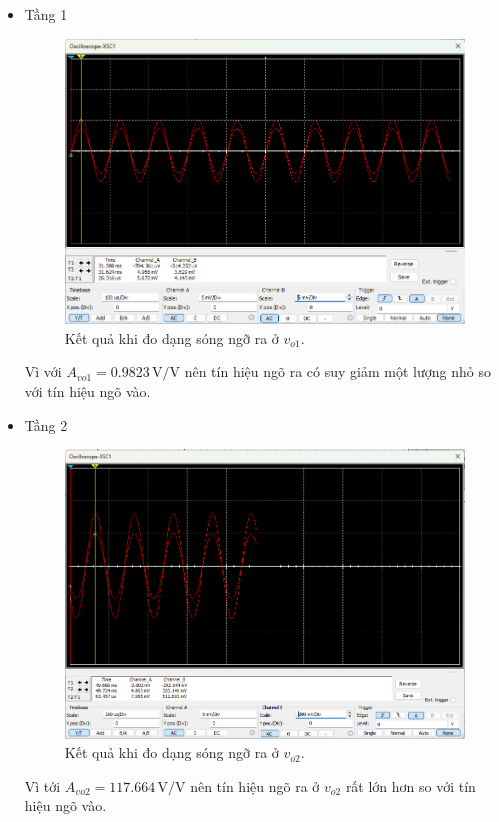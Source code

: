 \begin{itemize}[label=-]
	\item Tầng 1
	\begin{figure}[H]
		\centering
		\begin{minipage}{.4\linewidth}
			\includegraphics[width=\linewidth]{./my-chapters/my-images/Question5/c_vo1.png}
		\end{minipage}
		\caption{Kết quả khi đo dạng sóng ngỡ ra ở $v_{o1}$.}
	\end{figure}
	
	Vì với $A_{vo1} = 0.9823\,\text{V/V}$ nên tín hiệu ngõ ra có suy giảm một lượng nhỏ so với tín hiệu ngõ vào.
	\item Tầng 2
	\begin{figure}[H]
		\centering
		\begin{minipage}{.4\linewidth}
			\includegraphics[width=\linewidth]{./my-chapters/my-images/Question5/c_vo2.png}
		\end{minipage}
		\caption{Kết quả khi đo dạng sóng ngỡ ra ở $v_{o2}$.}
	\end{figure}
	
	Vì tới $A_{vo2} = 117.664\,\text{V/V}$ nên tín hiệu ngõ ra ở $v_{o2}$ rất lớn hơn so với tín hiệu ngõ vào.
\end{itemize}

